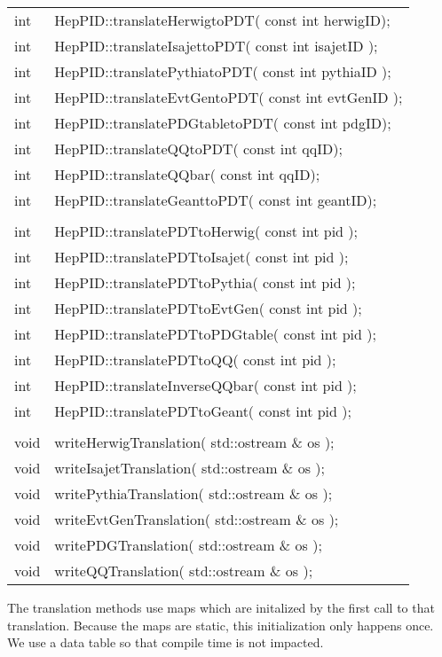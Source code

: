 \begin{center}
\begin{tabular}{ll}
int & HepPID::translateHerwigtoPDT( const int herwigID); \\
int & HepPID::translateIsajettoPDT( const int isajetID ); \\
int & HepPID::translatePythiatoPDT( const int pythiaID ); \\
int & HepPID::translateEvtGentoPDT( const int evtGenID ); \\
int & HepPID::translatePDGtabletoPDT( const int pdgID); \\
int & HepPID::translateQQtoPDT( const int qqID); \\
int & HepPID::translateQQbar( const int qqID); \\
int & HepPID::translateGeanttoPDT( const int geantID); \\
 \\
int & HepPID::translatePDTtoHerwig( const int pid ); \\
int & HepPID::translatePDTtoIsajet( const int pid ); \\
int & HepPID::translatePDTtoPythia( const int pid ); \\
int & HepPID::translatePDTtoEvtGen( const int pid ); \\
int & HepPID::translatePDTtoPDGtable( const int pid ); \\
int & HepPID::translatePDTtoQQ( const int pid ); \\
int & HepPID::translateInverseQQbar( const int pid ); \\
int & HepPID::translatePDTtoGeant( const int pid ); \\
 \\
void & writeHerwigTranslation( std::ostream \& os ); \\
void & writeIsajetTranslation( std::ostream \& os ); \\
void & writePythiaTranslation( std::ostream \& os ); \\
void & writeEvtGenTranslation( std::ostream \& os ); \\
void & writePDGTranslation( std::ostream \& os ); \\
void & writeQQTranslation( std::ostream \& os ); \\
\end{tabular}
\end{center}

The translation methods use maps which are initalized by the first call 
to that translation.
Because the maps are static, this initialization only happens once.
We use a data table so that compile time is not impacted.

